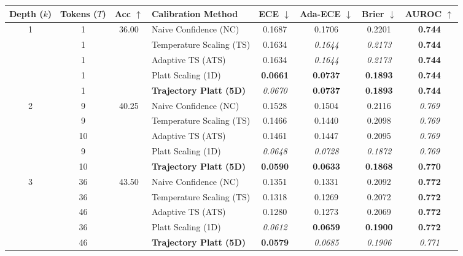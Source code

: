 \begin{table}[t]
\setlength{\tabcolsep}{4pt}
\renewcommand{\arraystretch}{1.05}
\centering
\footnotesize
\begin{tabular}{ccclcccc}
\toprule
\textbf{Depth ($k$)} & \textbf{Tokens ($T$)} & \textbf{Acc} $\uparrow$ & \textbf{Calibration Method} & \textbf{ECE} $\downarrow$ & \textbf{Ada-ECE} $\downarrow$ & \textbf{Brier} $\downarrow$ & \textbf{AUROC} $\uparrow$ \\
\midrule
\multirow{5}{*}{1} & 1 & \multirow{5}{*}{36.00} & Naive Confidence (NC) & 0.1687 & 0.1706 & 0.2201 & \textbf{0.744} \\
 & 1 &  & Temperature Scaling (TS) & 0.1634 & \textit{0.1644} & \textit{0.2173} & \textbf{0.744} \\
 & 1 &  & Adaptive TS (ATS) & 0.1634 & \textit{0.1644} & \textit{0.2173} & \textbf{0.744} \\
 & 1 &  & Platt Scaling (1D) & \textbf{0.0661} & \textbf{0.0737} & \textbf{0.1893} & \textbf{0.744} \\
 & 1 &  & \textbf{Trajectory Platt (5D)} & \textit{0.0670} & \textbf{0.0737} & \textbf{0.1893} & \textbf{0.744} \\
\midrule
\multirow{5}{*}{2} & 9 & \multirow{5}{*}{40.25} & Naive Confidence (NC) & 0.1528 & 0.1504 & 0.2116 & \textit{0.769} \\
 & 9 &  & Temperature Scaling (TS) & 0.1466 & 0.1440 & 0.2098 & \textit{0.769} \\
 & 10 &  & Adaptive TS (ATS) & 0.1461 & 0.1447 & 0.2095 & \textit{0.769} \\
 & 9 &  & Platt Scaling (1D) & \textit{0.0648} & \textit{0.0728} & \textit{0.1872} & \textit{0.769} \\
 & 10 &  & \textbf{Trajectory Platt (5D)} & \textbf{0.0590} & \textbf{0.0633} & \textbf{0.1868} & \textbf{0.770} \\
\midrule
\multirow{5}{*}{3} & 36 & \multirow{5}{*}{43.50} & Naive Confidence (NC) & 0.1351 & 0.1331 & 0.2092 & \textbf{0.772} \\
 & 36 &  & Temperature Scaling (TS) & 0.1318 & 0.1269 & 0.2072 & \textbf{0.772} \\
 & 46 &  & Adaptive TS (ATS) & 0.1280 & 0.1273 & 0.2069 & \textbf{0.772} \\
 & 36 &  & Platt Scaling (1D) & \textit{0.0612} & \textbf{0.0659} & \textbf{0.1900} & \textbf{0.772} \\
 & 46 &  & \textbf{Trajectory Platt (5D)} & \textbf{0.0579} & \textit{0.0685} & \textit{0.1906} & \textit{0.771} \\

\end{tabular}
\end{table}
